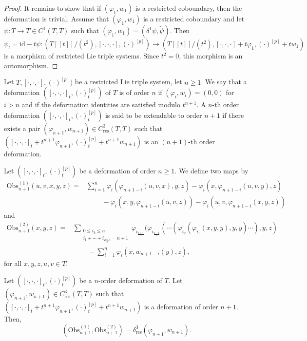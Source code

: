 \documentclass[11pt, twoside]{article}
\begin{document}
\begin{proof}
    It remains to show that if $(\varphi_1,w_1) $ is a restricted coboundary, then the deformation is trivial. Assume that $(\varphi_1,w_1) $ is a restricted coboundary and let $\psi:T\to T \in C^1(T,T)$ such that $(\varphi_1,w_1)=(\delta^1\psi,\tilde{\psi}) $. Then $\psi_t= \mathrm{id}-t\psi:(T[[t]]/(t^2),[\cdot,\cdot,\cdot],(\cdot)^{[p]}) \to (T[[t]]/(t^2),[\cdot,\cdot,\cdot]+t\varphi_1, (\cdot)^{[p]}+tw_1)$ is a morphism of restricted Lie triple systems. Since $t^2=0$, this morphism is an automorphism. 
\end{proof}

Let $T,[\cdot,\cdot,\cdot],(\cdot)^{[p]}) $ be a restricted Lie triple system, let $n\geq 1$. We say that a deformation $([\cdot,\cdot,\cdot]_t,(\cdot)^{[p]}_t) $ of $T$ is of order $n$ if $(\varphi_i,w_i)=(0,0) $ for $i> n$ and if the deformation identities are satisfied modulo $t^{n+1}$. A $n$-th order deformation $([\cdot,\cdot,\cdot]_t,(\cdot)^{[p]}_t) $ is said to be extendable to order $n+1$ if there exists a pair $(\varphi_{n+1},w_{n+1})\in C^3_\mathrm{res}(T,T) $ such that $([\cdot,\cdot,\cdot]_t+ t^{n+1}\varphi_{n+1},(\cdot)^{[p]}_t+t^{n+1}w_{n+1} ) $ is an $(n+1)$-th order deformation. 

\begin{defi}
    Let $([\cdot,\cdot,\cdot]_t,(\cdot)^{[p]}_t) $ be a deformation of order $n\geq 1$. We define two maps by \begin{align*}
        \mathrm{Obs}_{n+1}^{(1)}(u,v,x,y,z)=& \sum\limits_{i=1}^{n}\varphi_i(\varphi_{n+1-i}(u,v,x),y,z)-\varphi_i(x,\varphi_{n+1-i}(u,v,y),z)\\&\,\,\,\,\,\,\,\,\,\,\,\,\,\, -\varphi_i(x,y,\varphi_{n+1-i}(u,v,z))-\varphi_i(u,v,\varphi_{n+1-i}(x,y,z))
    \end{align*} and \begin{align*}
        \mathrm{Obs}_{n+1}^{(2)}(x,y,z)=& \sum_{\substack{0\leq i_k\leq n \\ i_1+\cdots+i_{\frac{p+1}{2}}=n+1}}\varphi_{i_\frac{p+1}{2}}(\varphi_{i_{\frac{p-1}{2}}}(\cdots(\varphi_{i_2}(\varphi_{i_1}(x,y,y),y,y)\cdots),y,z)\\& \,\,\,\,\,\,\,\,\,\,\,\,\,- \sum\limits_{i=1}^n\varphi_i(x,w_{n+1-i}(y),z),
    \end{align*} for all $x,y,z,u,v\in T$.
\end{defi}

\begin{prop}\label{propObs}
    Let $([\cdot,\cdot,\cdot]_t,(\cdot)^{[p]}_t) $ be a $n$-order deformation of $T$. Let $(\varphi_{n+1},w_{n+1})\in C^3_\mathrm{res}(T,T) $ such that $([\cdot,\cdot,\cdot]_t+t^{n+1}\varphi_{n+1} ,(\cdot)^{[p]}_t+t^{n+1}w_{n+1}) $ is a deformation of order $n+1$. Then,  $$(\mathrm{Obs}_{n+1}^{(1)},\mathrm{Obs}_{n+1}^{(2)})=\delta^3_\mathrm{res}(\varphi_{n+1},w_{n+1}). $$ 
\end{prop}
\end{document}
